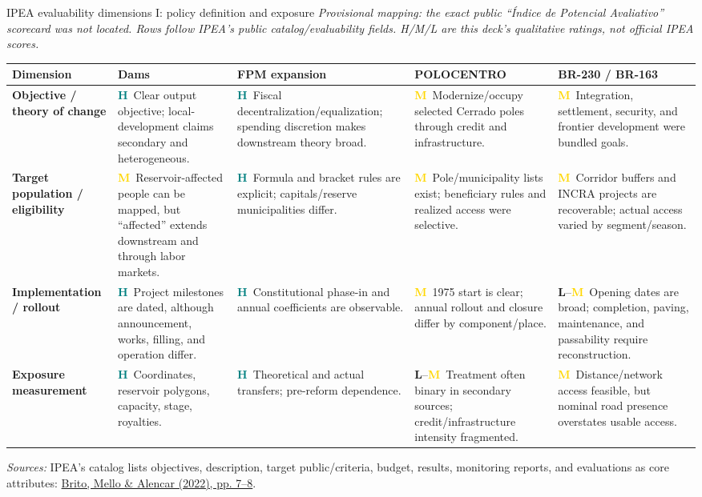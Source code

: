 \documentclass[aspectratio=169,10pt]{beamer}
\newcommand{\hi}{\textcolor{Teal}{\textbf{H}}}
\newcommand{\med}{\textcolor{Gold}{\textbf{M}}}
\newcommand{\low}{\textcolor{Brick}{\textbf{L}}}
\newcommand{\ShortSource}[1]{%
  \vfill\par\tiny\color{Muted}\textit{Sources:} #1}
\begin{document}
\begin{frame}{IPEA evaluability dimensions I: policy definition and exposure}
\scriptsize
\textit{Provisional mapping: the exact public ``Índice de Potencial Avaliativo'' scorecard was not located. Rows follow IPEA's public catalog/evaluability fields. H/M/L are this deck's qualitative ratings, not official IPEA scores.}
\vspace{0.35em}
\renewcommand{\arraystretch}{1.25}
\begin{tabularx}{\textwidth}{L{2.35cm}YYYY}
\toprule
\textbf{Dimension} & \textbf{Dams} & \textbf{FPM expansion} & \textbf{POLOCENTRO} & \textbf{BR-230 / BR-163} \\
\midrule
\textbf{Objective / theory of change} & \hi\ Clear output objective; local-development claims secondary and heterogeneous. & \hi\ Fiscal decentralization/equalization; spending discretion makes downstream theory broad. & \med\ Modernize/occupy selected Cerrado poles through credit and infrastructure. & \med\ Integration, settlement, security, and frontier development were bundled goals. \\
\textbf{Target population / eligibility} & \med\ Reservoir-affected people can be mapped, but ``affected'' extends downstream and through labor markets. & \hi\ Formula and bracket rules are explicit; capitals/reserve municipalities differ. & \med\ Pole/municipality lists exist; beneficiary rules and realized access were selective. & \med\ Corridor buffers and INCRA projects are recoverable; actual access varied by segment/season. \\
\textbf{Implementation / rollout} & \hi\ Project milestones are dated, although announcement, works, filling, and operation differ. & \hi\ Constitutional phase-in and annual coefficients are observable. & \med\ 1975 start is clear; annual rollout and closure differ by component/place. & \low--\med\ Opening dates are broad; completion, paving, maintenance, and passability require reconstruction. \\
\textbf{Exposure measurement} & \hi\ Coordinates, reservoir polygons, capacity, stage, royalties. & \hi\ Theoretical and actual transfers; pre-reform dependence. & \low--\med\ Treatment often binary in secondary sources; credit/infrastructure intensity fragmented. & \med\ Distance/network access feasible, but nominal road presence overstates usable access. \\
\bottomrule
\end{tabularx}
\ShortSource{IPEA's catalog lists objectives, description, target public/criteria, budget, results, monitoring reports, and evaluations as core attributes: \href{https://catalogo.ipea.gov.br/arquivos/posts/4565-td2799web.pdf}{Brito, Mello \& Alencar (2022), pp. 7--8}.}
\end{frame}
\end{document}
